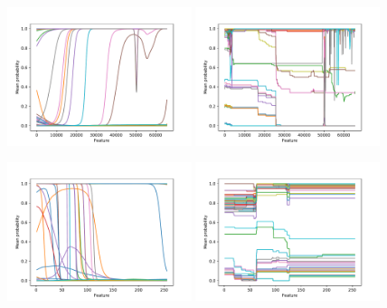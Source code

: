 \documentclass[sigconf,nonacm]{acmart}
\begin{document}
\begin{figure}[p]
\includegraphics[width=0.48\textwidth]{plots/ice/sourceTransportPort_nn_0.pdf}
\includegraphics[width=0.48\textwidth]{plots/ice/sourceTransportPort_rf_0.pdf}

\includegraphics[width=0.48\textwidth]{plots/ice/apply(mean(ipTTL),forward)_nn_0.pdf}
\includegraphics[width=0.48\textwidth]{plots/ice/apply(mean(ipTTL),forward)_rf_0.pdf}


\end{figure}
\end{document}
